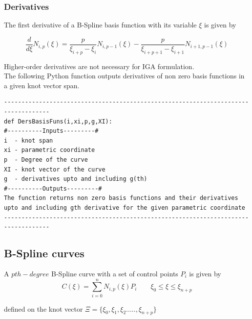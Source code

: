 \documentclass[11pt]{article}
\begin{document}
\subsubsection{Derivatives }
The first derivative of a B-Spline basis function \cite{nguyen2012introduction} with its variable $\xi$ is
given by

\begin{equation}
\frac{d}{d\xi}N_{i,p}(\xi) = \frac{p}{\xi_{i+p}-\xi_{i}} N_{i,p-1}(\xi) -
\frac{p}{\xi_{i+p+1}-\xi_{i+1}} N_{i+1,p-1}(\xi)
\end{equation}

\noindent
Higher-order derivatives are not necessary for IGA formulation.\\
The following Python function outputs derivatives of non zero basis functions in a given knot vector span.
\begin{verbatim}
-----------------------------------------------------------------------------------
def DersBasisFuns(i,xi,p,g,XI):
#----------Inputs---------#
i  - knot span
xi - parametric coordinate
p  - Degree of the curve
XI - knot vector of the curve
g  - derivatives upto and including g(th) 
#----------Outputs---------#
The function returns non zero basis functions and their derivatives
upto and including gth derivative for the given parametric coordinate
-----------------------------------------------------------------------------------
\end{verbatim}

\subsection{B-Spline curves}

A $pth-degree$ B-Spline curve with a set of control points $P_i$ is given by \cite{piegl2012nurbs}
\begin{equation}
C(\xi) = \sum_{i=0}^{n} N_{i,p}(\xi) P_i \qquad \xi_0 \leq \xi \leq \xi_{n+p}
\end{equation}

\noindent
defined on the knot vector $\Xi = \{ \xi_0,\xi_1,\xi_2.....,\xi_{n+p}\}$
\end{document}
